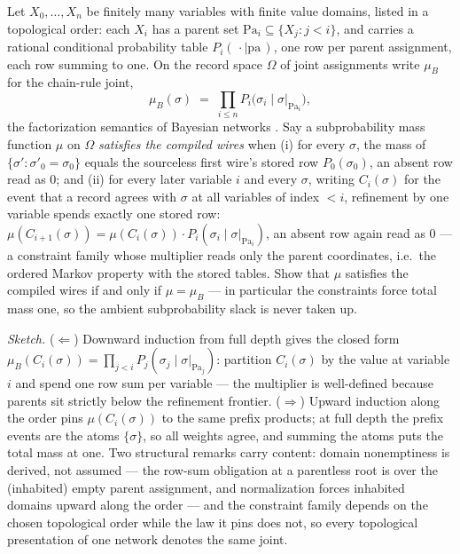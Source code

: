 \begin{problem}
\label{prob:mt-bn}
Let $X_0, \dots, X_n$ be finitely many variables
with finite value domains, listed in a topological order: each
$X_i$ has a parent set $\mathrm{Pa}_i \subseteq \{X_j : j < i\}$,
and carries a rational conditional probability table
$P_i(\,\cdot \mid \mathrm{pa}\,)$, one row per parent assignment,
each row summing to one. On the record space $\Omega$ of joint
assignments write $\mu_B$ for the chain-rule joint,
\[
  \mu_B(\sigma) \;=\; \prod_{i \le n}
  P_i\big(\sigma_i \mid \sigma|_{\mathrm{Pa}_i}\big),
\]
the factorization semantics of Bayesian networks
\cite{koller-friedman-2009, pearl-1988}. Say a subprobability mass
function $\mu$ on $\Omega$ \emph{satisfies the compiled wires} when
(i) for every $\sigma$, the mass of
$\{\sigma' : \sigma'_0 = \sigma_0\}$ equals the sourceless first
wire's stored row $P_0(\sigma_0)$, an absent row read as $0$; and
(ii) for every later variable $i$ and every $\sigma$, writing
$C_i(\sigma)$ for the event that a record agrees with $\sigma$ at
all variables of index $< i$, refinement by one variable spends
exactly one stored row:
$\mu(C_{i+1}(\sigma)) = \mu(C_i(\sigma)) \cdot
P_i(\sigma_i \mid \sigma|_{\mathrm{Pa}_i})$, an absent row again
read as $0$ --- a constraint family whose multiplier reads only the
parent coordinates, i.e.\ the ordered Markov property with the
stored tables. Show that $\mu$ satisfies the compiled wires if and
only if $\mu = \mu_B$ --- in particular the constraints force total
mass one, so the ambient subprobability slack is never taken up.
\end{problem}

\emph{Sketch.} ($\Leftarrow$) Downward induction from full depth
gives the closed form $\mu_B(C_i(\sigma)) = \prod_{j < i}
P_j(\sigma_j \mid \sigma|_{\mathrm{Pa}_j})$: partition
$C_i(\sigma)$ by the value at variable $i$ and spend one row sum
per variable --- the multiplier is well-defined because parents sit
strictly below the refinement frontier. ($\Rightarrow$) Upward
induction along the order pins $\mu(C_i(\sigma))$ to the same
prefix products; at full depth the prefix events are the atoms
$\{\sigma\}$, so all weights agree, and summing the atoms puts the
total mass at one. Two structural remarks carry content: domain
nonemptiness is derived, not assumed --- the row-sum obligation at
a parentless root is over the (inhabited) empty parent assignment,
and normalization forces inhabited domains upward along the order
--- and the constraint family depends on the chosen topological
order while the law it pins does not, so every topological
presentation of one network denotes the same joint.

